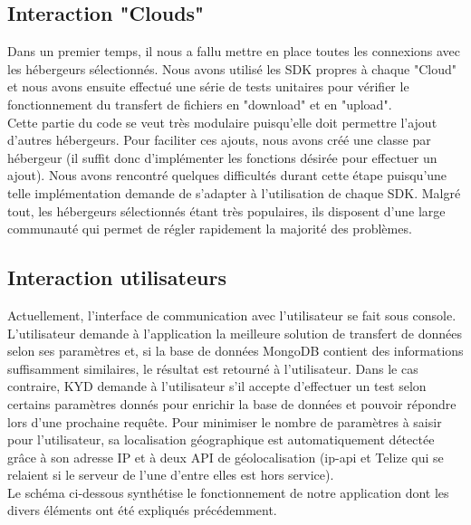 \documentclass[10pt]{article}
\begin{document}
\subsection{Interaction "Clouds"}

Dans un premier temps, il nous a fallu mettre en place toutes les
connexions avec les hébergeurs sélectionnés. Nous avons utilisé les
SDK propres à chaque "Cloud" et nous avons ensuite effectué une série
de tests unitaires pour vérifier le fonctionnement du transfert de
fichiers en "download" et en "upload".\\

Cette partie du code se veut très modulaire puisqu'elle doit permettre
l'ajout d'autres hébergeurs. Pour faciliter ces ajouts, nous avons
créé une classe par hébergeur (il suffit donc d'implémenter les
fonctions désirée pour effectuer un ajout). Nous avons rencontré
quelques difficultés durant cette étape puisqu'une telle
implémentation demande de s'adapter à l'utilisation de chaque
SDK. Malgré tout, les hébergeurs sélectionnés étant très populaires,
ils disposent d'une large communauté qui permet de régler rapidement
la majorité des problèmes.

\subsection{Interaction utilisateurs}

Actuellement, l'interface de communication avec l'utilisateur se fait
sous console. L'utilisateur demande à l'application la meilleure
solution de transfert de données selon ses paramètres et, si la base
de données MongoDB contient des informations suffisamment similaires,
le résultat est retourné à l'utilisateur. Dans le cas contraire, KYD
demande à l'utilisateur s'il accepte d'effectuer un test selon
certains paramètres donnés pour enrichir la base de données et pouvoir
répondre lors d'une prochaine requête. Pour minimiser le nombre de
paramètres à saisir pour l'utilisateur, sa localisation géographique
est automatiquement détectée grâce à son adresse IP et à deux API de
géolocalisation (ip-api et Telize qui se relaient si le serveur de
l'une d'entre elles est hors service).\\

Le schéma ci-dessous synthétise le fonctionnement de notre application
dont les divers éléments ont été expliqués précédemment.
\end{document}
